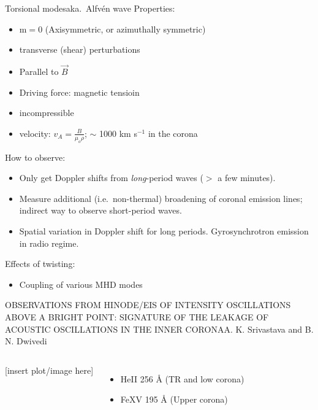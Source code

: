 \documentclass[table]{beamer}
\begin{document}
\begin{frame}{Torsional modes}{aka.\ Alfv\'en wave}
    Properties:
    \begin{itemize}
        \item m$=$0 (Axisymmetric, or azimuthally symmetric)
        \item transverse (shear) perturbations
        \item Parallel to $\vec{B}$
        \item Driving force: magnetic tensioin
        \item incompressible
        \item velocity: $v_{A} = \frac{B}{\mu_{o}\rho}$;
            $\sim$ 1000 km s$^{-1}$ in the corona
    \end{itemize}
    How to observe:
    \begin{itemize}
        \item Only get Doppler shifts from \emph{long}-period waves
            ($>$ a few minutes).
        \item Measure additional (i.e.\ non-thermal) broadening
            of coronal emission lines; indirect way to observe short-period waves.
        \item Spatial variation in Doppler shift for long periods.
            Gyrosynchrotron emission in radio regime.
    \end{itemize}
    Effects of twisting:
    \begin{itemize}
        \item Coupling of various MHD modes
    \end{itemize}
\end{frame}%
\begin{frame}{OBSERVATIONS FROM HINODE/EIS OF INTENSITY OSCILLATIONS
        ABOVE A BRIGHT POINT\@: SIGNATURE OF THE LEAKAGE OF ACOUSTIC
    OSCILLATIONS IN THE INNER CORONA}{A. K. Srivastava and B. N. Dwivedi}
    \begin{columns}
        \column{0.5\paperwidth}
        [insert plot/image here]
        \column{0.5\paperwidth}
        \begin{itemize}
            \item He{\footnotesize II} 256 \AA{} (TR and low corona)
            \item Fe{\footnotesize XV} 195 \AA{} (Upper corona)
        \end{itemize}
    \end{columns}
\end{frame}%
\end{document}
